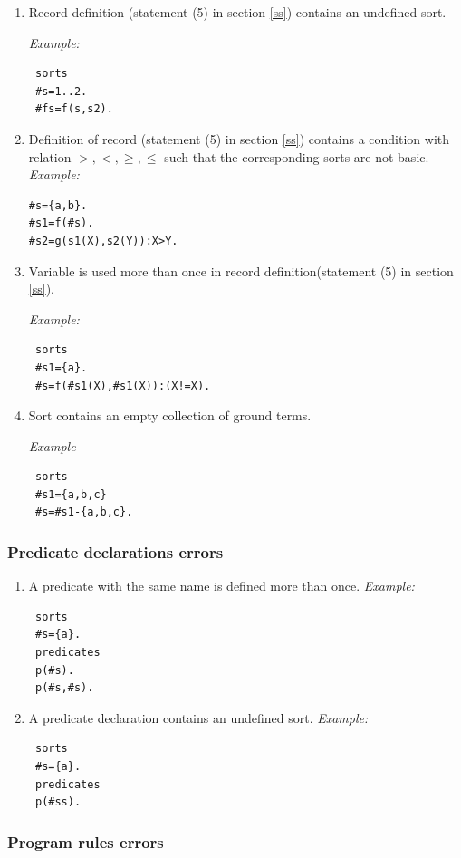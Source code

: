 \documentclass[12pt, letterpaper]{article}
\begin{document}
\begin{enumerate}
\item Record definition (statement (5) in section \ref{ss}) contains an undefined sort.

\textit{Example:}
\begin{verbatim}
 sorts
 #s=1..2.
 #fs=f(s,s2).
\end{verbatim}



\item Definition of record (statement (5) in section \ref{ss}) contains a condition with relation $>,<,\geq,\leq$ such that the
   corresponding sorts are not basic.
\textit{Example:}
\begin{verbatim}
#s={a,b}.
#s1=f(#s). 
#s2=g(s1(X),s2(Y)):X>Y.
\end{verbatim}

\item  Variable is used more than once in record definition(statement  (5) in section \ref{ss}).

\textit{Example:}

\begin{verbatim}
 sorts
 #s1={a}.
 #s=f(#s1(X),#s1(X)):(X!=X).
\end{verbatim}
\item Sort contains an empty collection of ground terms.

\textit{Example}
\begin{verbatim}
 sorts
 #s1={a,b,c}
 #s=#s1-{a,b,c}.
\end{verbatim}
\end{enumerate}
\subsubsection{Predicate declarations errors}

\begin{enumerate}
\item A predicate with the same name is defined more than once.
\textit{Example:}
\begin{verbatim}
 sorts
 #s={a}.
 predicates
 p(#s).
 p(#s,#s).
\end{verbatim}
\item A predicate declaration contains an undefined sort.
\textit{Example:}
\begin{verbatim}
 sorts
 #s={a}.
 predicates
 p(#ss).
\end{verbatim}
\end{enumerate}
\subsubsection{Program rules errors}
\end{document}
